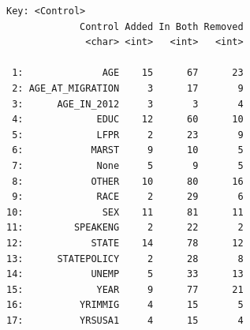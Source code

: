 \documentclass[
  letterpaper,
  DIV=11,
  numbers=noendperiod]{scrartcl}
\begin{document}
\begin{verbatim}
Key: <Control>
             Control Added In Both Removed
              <char> <int>   <int>   <int>

 1:              AGE    15      67      23
 2: AGE_AT_MIGRATION     3      17       9
 3:      AGE_IN_2012     3       3       4
 4:             EDUC    12      60      10
 5:             LFPR     2      23       9
 6:            MARST     9      10       5
 7:             None     5       9       5
 8:            OTHER    10      80      16
 9:             RACE     2      29       6
10:              SEX    11      81      11
11:         SPEAKENG     2      22       2
12:            STATE    14      78      12
13:      STATEPOLICY     2      28       8
14:            UNEMP     5      33      13
15:             YEAR     9      77      21
16:          YRIMMIG     4      15       5
17:          YRSUSA1     4      15       4
\end{verbatim}
\end{document}
